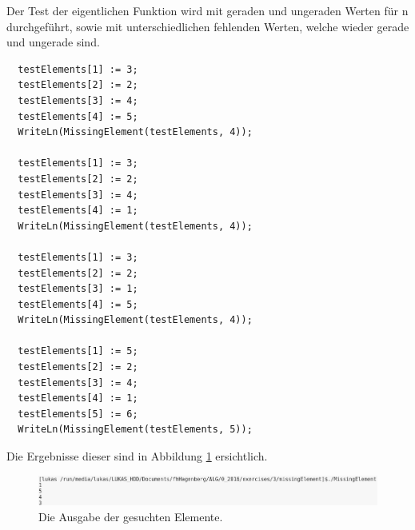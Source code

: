 \documentclass[a4paper]{article}
\begin{document}
\begin{enumerate}
		Der Test der eigentlichen Funktion wird mit geraden und ungeraden Werten für n durchgeführt, sowie mit unterschiedlichen fehlenden Werten, welche wieder gerade und ungerade sind.
		
		\begin{lstlisting}
  testElements[1] := 3;
  testElements[2] := 2;
  testElements[3] := 4;
  testElements[4] := 5;
  WriteLn(MissingElement(testElements, 4));

  testElements[1] := 3;
  testElements[2] := 2;
  testElements[3] := 4;
  testElements[4] := 1;
  WriteLn(MissingElement(testElements, 4));

  testElements[1] := 3;
  testElements[2] := 2;
  testElements[3] := 1;
  testElements[4] := 5;
  WriteLn(MissingElement(testElements, 4));

  testElements[1] := 5;
  testElements[2] := 2;
  testElements[3] := 4;
  testElements[4] := 1;
  testElements[5] := 6;
  WriteLn(MissingElement(testElements, 5));
		\end{lstlisting}
		
		Die Ergebnisse dieser sind in Abbildung \ref{missingElements} ersichtlich.
		\begin{center}
			\begin{figure}[ht!]
				\includegraphics[scale=0.40]{missingElement/test/missingElements.png}
				\caption{Die Ausgabe der gesuchten Elemente.}
				\label{missingElements}
			\end{figure}
		\end{center}
	\end{enumerate}
\end{document}

